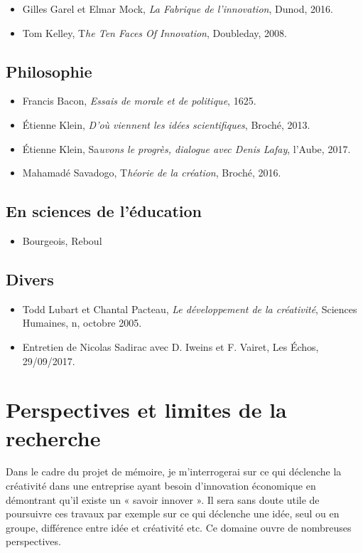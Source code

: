 \documentclass{article}
\begin{document}
\begin{itemize}

\item Gilles Garel et Elmar Mock, \textit{La Fabrique de l'innovation}, Dunod, 2016.
\item Tom Kelley, T\textit{he Ten Faces Of Innovation}, Doubleday, 2008.

\end{itemize}

\subsection{Philosophie}

\begin{itemize}

\item Francis Bacon, \textit{Essais de morale et de politique}, 1625.
\item Étienne Klein, \textit{D'où viennent les idées scientifiques}, Broché, 2013.
\item Étienne Klein, Sa\textit{uvons le progrès, dialogue avec Denis Lafay}, l’Aube, 2017.
\item Mahamadé Savadogo, T\textit{héorie de la création}, Broché, 2016.	

\end{itemize}

\subsection{En sciences de l’éducation}

\begin{itemize}

\item Bourgeois, Reboul

\end{itemize}

\subsection{Divers}

\begin{itemize}

\item Todd Lubart et Chantal Pacteau, \textit{Le développement de la créativité}, Sciences Humaines, n, octobre 2005.
\item Entretien de Nicolas Sadirac avec D. Iweins et F. Vairet, Les Échos, 29/09/2017.

\end{itemize}

\section{Perspectives et limites de la recherche}

Dans le cadre du projet de mémoire, je m'interrogerai sur ce qui déclenche la créativité dans une entreprise ayant besoin d'innovation économique en démontrant qu'il existe un « savoir innover ». Il sera sans doute utile de poursuivre ces travaux par exemple sur ce qui déclenche une idée, seul ou en groupe, différence entre idée et créativité etc. Ce domaine ouvre de nombreuses perspectives.  
\end{document}
